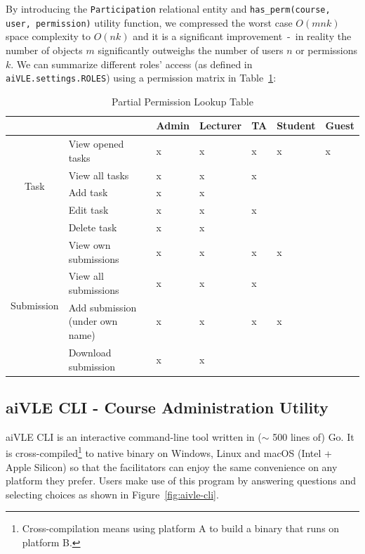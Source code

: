 By introducing the \texttt{Participation} relational entity and \texttt{has\_perm(course, user, permission)} utility function, we compressed the worst case $O(mnk)$ space complexity to $O(nk)$ and it is a significant improvement~-~in reality the number of objects $m$ significantly outweighs the number of users $n$ or permissions $k$. We can summarize different roles' access (as defined in \texttt{aiVLE.settings.ROLES}) using a permission matrix in Table~\ref{tab:aivle-web-permission-table}:

\begin{table}[H]
\centering
\begin{tabular}{|c|l|l|l|l|l|l|}
\hline
\multicolumn{1}{|l|}{} &  & Admin & Lecturer & TA & Student & Guest \\ \hline
\multirow{5}{*}{Task} & View opened tasks & x & x & x & x & x \\ \cline{2-7} 
 & View all tasks & x & x & x &  &  \\ \cline{2-7} 
 & Add task & x & x &  &  &  \\ \cline{2-7} 
 & Edit task & x & x & x &  &  \\ \cline{2-7} 
 & Delete task & x & x &  &  &  \\ \hline
\multirow{4}{*}{Submission} & View own submissions & x & x & x & x &  \\ \cline{2-7} 
 & View all submissions & x & x & x &  &  \\ \cline{2-7} 
 & Add submission (under own name) & x & x & x & x &  \\ \cline{2-7} 
 & Download submission & x & x &  &  &  \\ \hline
\end{tabular}
\caption{Partial Permission Lookup Table}
\label{tab:aivle-web-permission-table}
\end{table}

\subsection{aiVLE CLI - Course Administration Utility}
\label{ss:aivle-cli}

aiVLE CLI is an interactive command-line tool written in ($\sim$ 500 lines of) Go. It is cross-compiled\footnote{Cross-compilation means using platform A to build a binary that runs on platform B.} to native binary on Windows, Linux and macOS (Intel + Apple Silicon) so that the facilitators can enjoy the same convenience on any platform they prefer. Users make use of this program by answering questions and selecting choices as shown in Figure~\ref{fig:aivle-cli}.

